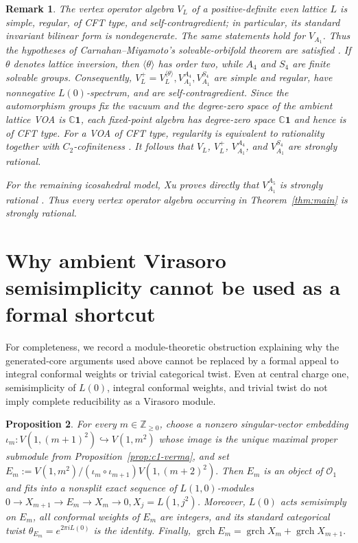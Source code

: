 \documentclass[12pt,leqno]{amsart}
\numberwithin{equation}{section} \newtheorem{thm}{Theorem}[section] \newtheorem{lem}[thm]{Lemma} \newtheorem{ex}[thm]{Example} \newtheorem{prop}[thm]{Proposition} \newtheorem{cor}[thm]{Corollary} \newtheorem{defi}[thm]{Definition} \newtheorem{rmk}[thm]{Remark} \newtheorem{notation}[thm]{Notation}
\newcommand{\one}{\mathbf{1}}
\newcommand{\grch}{\operatorname{grch}}
\newcommand{\Ovir}{\mathcal O_1}
\def\Z{\mathbb{Z}} \def\N{\mathbb{N}} \def\A{\mathbb{A}} \def\C{\mathbb{C}} \def\R{\mathbb{R}} \def\Q{\mathbb{Q}} \def\F{\mathbb{F}}
\begin{document}
\begin{rmk}
The vertex operator algebra $V_L$ of a positive-definite even lattice $L$ is simple, regular, of CFT type, and self-contragredient; in particular, its standard invariant bilinear form is nondegenerate. The same statements hold for $V_{A_1}$. Thus the hypotheses of Carnahan--Miyamoto's solvable-orbifold theorem are satisfied \cite[Corollary~5.25]{CarnahanMiyamoto}. If $\theta$ denotes lattice inversion, then $\langle\theta\rangle$ has order two, while $A_4$ and $S_4$ are finite solvable groups. Consequently, \(V_L^+=V_L^{\langle\theta\rangle}, V_{A_1}^{A_4}, V_{A_1}^{S_4}\) are simple and regular, have nonnegative $L(0)$-spectrum, and are self-contragredient. Since the automorphism groups fix the vacuum and the degree-zero space of the ambient lattice VOA is $\C\one$, each fixed-point algebra has degree-zero space $\C\one$ and hence is of CFT type. For a VOA of CFT type, regularity is equivalent to rationality together with $C_2$-cofiniteness \cite[Theorem~4.5]{ABD}. It follows that $V_L$, $V_L^+$, $V_{A_1}^{A_4}$, and $V_{A_1}^{S_4}$ are strongly rational.

For the remaining icosahedral model, Xu proves directly that $V_{A_1}^{A_5}$ is strongly rational \cite{A5new}. Thus every vertex operator algebra occurring in Theorem~\ref{thm:main} is strongly rational.
\end{rmk}

\appendix
\section{Why ambient Virasoro semisimplicity cannot be used as a formal shortcut}\label{app:nonsplit}

For completeness, we record a module-theoretic obstruction explaining why the generated-core arguments used above cannot be replaced by a formal appeal to integral conformal weights or trivial categorical twist. Even at central charge one, semisimplicity of $L(0)$, integral conformal weights, and trivial twist do not imply complete reducibility as a Virasoro module.

\begin{prop}\label{prop:Em}
For every $m\in\Z_{\ge0}$, choose a nonzero singular-vector embedding \(\iota_m:V(1,(m+1)^2)\hookrightarrow V(1,m^2)\) whose image is the unique maximal proper submodule from Proposition~\ref{prop:c1-verma}, and set \(E_m:=V(1,m^2)\big/ (\iota_m\circ\iota_{m+1})V(1,(m+2)^2).\) Then $E_m$ is an object of $\Ovir$ and fits into a nonsplit exact sequence of $L(1,0)$-modules \(0\longrightarrow X_{m+1} \longrightarrow E_m \longrightarrow X_m \longrightarrow0, X_j=L(1,j^2)\). Moreover, $L(0)$ acts semisimply on $E_m$, all conformal weights of $E_m$ are integers, and its standard categorical twist \(\theta_{E_m}=e^{2\pi iL(0)}\) is the identity. Finally, \(\grch E_m=\grch X_m+\grch X_{m+1}.\)
\end{prop}
\end{document}
